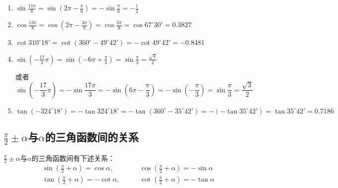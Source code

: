 \begin{solution}
\begin{enumerate}
    \item $\sin\frac{11\pi}{6}=\sin\left(2\pi-\frac{\pi}{6}\right)=-\sin\frac{\pi}{6}=-\frac{1}{2}$
    \item $\cos\frac{13\pi}{8}=\cos\left(2\pi-\frac{3\pi}{8}\right)=\cos\frac{3\pi}{8}=\cos67^{\circ}30'=0.3827$
    \item $\cot310^{\circ}18'=\cot(360^{\circ}-49^{\circ}42')=-\cot49^{\circ}42'=-0.8481$
    \item $\sin\left(-\frac{17}{3}\pi\right)=\sin\left(-6\pi+\frac{\pi}{3}\right)=\sin\frac{\pi}{3}=\frac{\sqrt{3}}{2}$
    
或者
\[\sin\left(-\frac{17}{3}\pi\right)=-\sin\frac{17\pi}{3}=-\sin\left(6\pi-\frac{\pi}{3}\right)=-\sin\left(-\frac{\pi}{3}\right)=\sin\frac{\pi}{3}=\frac{\sqrt{3}}{2}\]

    \item $\tan(-324^{\circ}18')=-\tan324^{\circ}18'=-\tan(360^{\circ}-35^{\circ}42')=-(-\tan 35^{\circ}42')=\tan 35^{\circ}42'=0.7186$
\end{enumerate}    
\end{solution}

\subsection{$\frac{\pi}{2}\pm\alpha$与$\alpha$的三角函数间的关系}

$\frac{\pi}{2}\pm\alpha$与$\alpha$的三角函数间有下述关系：
\begin{equation}
    \begin{split}
\sin\left(\frac{\pi}{2}+\alpha\right)=\cos\alpha,&\qquad \cos\left(\frac{\pi}{2}+\alpha\right)=-\sin\alpha\\
\tan\left(\frac{\pi}{2}+\alpha\right)=-\cot\alpha,&\qquad \cot\left(\frac{\pi}{2}+\alpha\right)=-\tan\alpha        
    \end{split}
\end{equation}

